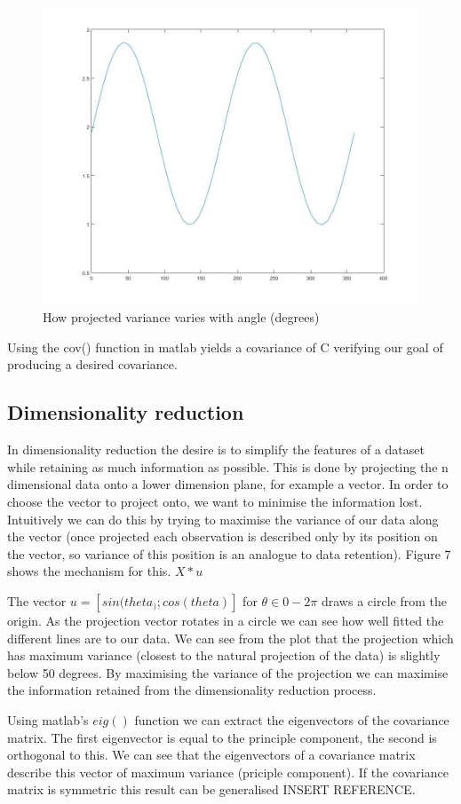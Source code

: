 \documentclass[10pt]{article}
\begin{document}
\begin{figure}[!h]
\begin{minipage}[b]{0.3\textwidth}
     \includegraphics[width=\textwidth]{variance.jpg}
     \caption{How projected variance varies with angle (degrees)}
  \end{minipage}
\end{figure}

Using the cov() function in matlab yields a covariance of C verifying our goal of producing a desired covariance.

\subsection{Dimensionality reduction}  
In dimensionality reduction the desire is to simplify the features of a dataset while retaining as much information as possible. This is done by projecting the n dimensional data onto a lower dimension plane, for example a vector. In order to choose the vector to project onto, we want to minimise the information lost. Intuitively we can do this by trying to maximise the variance of our data along the vector (once projected each observation is described only by its position on the vector, so variance of this position is an analogue to data retention). Figure 7 shows the mechanism for this. $ X*u $

The vector $u = [sin(theta_); cos(theta)]$ for $\theta \in {0-2\pi}$ draws a circle from the origin. As the projection vector rotates in a circle we can see how well fitted the different lines are to our data. We can see from the plot that the projection which has maximum variance (closest to the natural projection of the data) is slightly below 50 degrees. By maximising the variance of the projection we can maximise the information retained from the dimensionality reduction process. 

Using matlab's $eig()$ function we can extract the eigenvectors of the covariance matrix. The first eigenvector is equal to the principle component, the second is orthogonal to this. We can see that the eigenvectors of a covariance matrix describe this vector of maximum variance (priciple component). If the covariance matrix is symmetric this result can be generalised INSERT REFERENCE.
\end{document}
